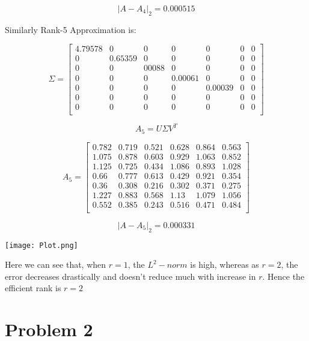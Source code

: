 \documentclass{article}
\begin{document}
$$
|A - A_4|_2 = 0.000515
$$

Similarly Rank-5 Approximation is:

$$
\Sigma = 
\begin{bmatrix}
4.79578 & 0 & 0 & 0 & 0 & 0 & 0\\
0 & 0.65359 & 0 & 0 & 0 & 0 & 0\\
0 & 0 & 00088 & 0 & 0 & 0 & 0\\
0 & 0 & 0 & 0.00061 & 0 & 0 & 0\\
0 & 0 & 0 & 0 & 0.00039 & 0 & 0\\
0 & 0 & 0 & 0 & 0 & 0 & 0\\
0 & 0 & 0 & 0 & 0 & 0 & 0\\
\end{bmatrix}
$$

$$
A_5 = 
U \Sigma V^T
$$ 

$$
A_5 = 
\begin{bmatrix}
0.782 & 0.719 & 0.521 & 0.628 & 0.864 & 0.563\\
1.075 & 0.878 & 0.603 & 0.929 & 1.063 & 0.852\\
1.125 & 0.725 & 0.434 & 1.086 & 0.893 & 1.028\\
0.66  & 0.777 & 0.613 & 0.429 & 0.921 & 0.354\\
0.36  & 0.308 & 0.216 & 0.302 & 0.371 & 0.275\\
1.227 & 0.883 & 0.568 & 1.13  & 1.079 & 1.056\\
0.552 & 0.385 & 0.243 & 0.516 & 0.471 & 0.484\\
\end{bmatrix}
$$

$$
|A - A_5|_2 = 0.000331
$$

\texttt{[image: Plot.png]}

Here we can see that, when $r=1$, the $L^2-norm$ is high, whereas as $r=2$, the error decreases drastically and doesn't reduce much with increase in $r$. Hence the efficient rank is $r=2$

\section*{Problem 2}
\end{document}
